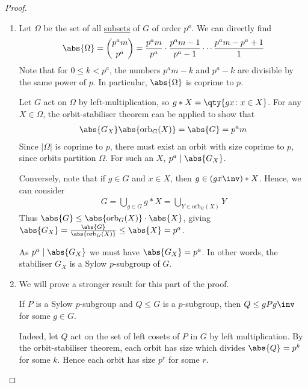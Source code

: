 \begin{proof}
	\begin{enumerate}
		\item Let $\Omega$ be the set of all \underline{subsets} of $G$ of order $p^a$.
		      We can directly find
		      \begin{align*}
			      \abs{\Omega} = \binom{p^a m}{p^a} = \frac{p^a m}{p^a} \cdot \frac{p^a m - 1}{p^a - 1} \cdots \frac{p^a m - p^a + 1}{1}
		      \end{align*}
		      Note that for $0 \leq k < p^a$, the numbers $p^a m - k$ and $p^a - k$ are divisible by the same power of $p$.
		      In particular, $\abs{\Omega}$ is coprime to $p$.

		      Let $G$ act on $\Omega$ by left-multiplication, so $g \ast X = \qty{gx \colon x \in X}$.
		      For any $X \in \Omega$, the orbit-stabiliser theorem can be applied to show that
		      \begin{align*}
			      \abs{G_X} \abs{\mathrm{orb}_G(X)} = \abs{G} = p^a m
		      \end{align*}
		      Since $|\Omega|$ is coprime to $p$, there must exist an orbit with size coprime to $p$, since orbits partition $\Omega$.
		      For such an $X$, $p^a \mid \abs{G_X}$.

		      Conversely, note that if $g \in G$ and $x \in X$, then $g \in (gx\inv) \ast X$.
		      Hence, we can consider
		      \begin{align*}
			      G = \bigcup_{g \in G} g \ast X = \bigcup_{Y \in \mathrm{orb}_G(X)} Y
		      \end{align*}
		      Thus $\abs{G} \leq \abs{\mathrm{orb}_G(X)} \cdot \abs{X}$, giving $\abs{G_X} = \frac{\abs{G}}{\abs{\mathrm{orb}_G(X)}} \leq \abs{X} = p^a$.

		      As $p^a \mid \abs{G_X}$ we must have $\abs{G_X} = p^a$.
		      In other words, the stabiliser $G_X$ is a Sylow $p$-subgroup of $G$.
		\item We will prove a stronger result for this part of the proof.
		      \begin{lemma} \label{lem:4.7}
				If $P$ is a Sylow $p$-subgroup and $Q \leq G$ is a $p$-subgroup, then $Q \leq g P g\inv$ for some $g \in G$.
			  \end{lemma} 

		      Indeed, let $Q$ act on the set of left cosets of $P$ in $G$ by left multiplication.
		      By the orbit-stabiliser theorem, each orbit has size which divides $\abs{Q} = p^k$ for some $k$.
		      Hence each orbit has size $p^r$ for some $r$.


\end{enumerate}
\end{proof}
